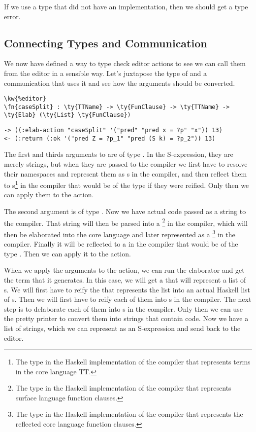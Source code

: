 If we use a type that did not have an  implementation, then
we should get a type error.

\subsection{Connecting Types and Communication}\label{ssec:typesAndCommunication}

We now have defined a way to type check editor actions to see we can call them
from the editor in a sensible way. Let's juxtapose the type of  and a communication that uses it and see how the arguments should be converted.
\begin{Verbatim}[framesep=2mm, label=\footnotesize{\normalfont{Idris}}, labelposition=topline]
\kw{%editor}
\fn{caseSplit} : \ty{TTName} -> \ty{FunClause} -> \ty{TTName} -> \ty{Elab} (\ty{List} \ty{FunClause})
\end{Verbatim}
\begin{Verbatim}[framesep=2mm, label=\footnotesize{\normalfont{S-expression}}, labelposition=topline]
-> ((:elab-action "caseSplit" '("pred" "pred x = ?p" "x")) 13)
<- (:return (:ok '("pred Z = ?p_1" "pred (S k) = ?p_2")) 13)
\end{Verbatim}

The first and thirds arguments to  are of type . In
the S-expression, they are merely strings, but when they are passed to the
compiler we first have to resolve their namespaces and represent them as
s in the compiler, and then reflect them to
s\footnote{The type in the Haskell implementation of the compiler
that represents terms in the core language TT.} in the compiler
that would be of the type  if they were reified.
Only then we can apply them to the  action.

The second argument is of type . Now we have actual code passed
as a string to the compiler. That string will then be parsed into a
\footnote{The type in the Haskell implementation of the compiler
that represents surface language function clauses.} in the compiler, which will
then be elaborated into the core language and later represented as a
\footnote{The type in the Haskell implementation of the
compiler that represents the reflected core language function clauses.} in the
compiler. Finally it will be reflected to a  in the compiler that
would be of the type . Then we can apply it to the
 action.

When we apply the arguments to the  action, we can run the
elaborator and get the term that it generates. In this case, we will get
a  that will represent a list of s.
We will first have to reify the  that represents the list into an
actual Haskell list of s. Then we will first have to reify each of
them into s in the compiler. The next step is to delaborate
each of them into s in the compiler. Only then we can use the
pretty printer to convert them into strings that contain code.
Now we have a list of strings, which we can represent as an S-expression and
send back to the editor.
